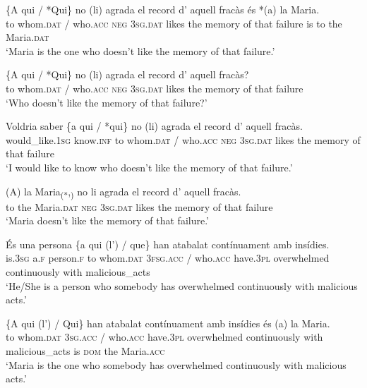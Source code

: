 \documentclass[output=paper,colorlinks,citecolor=brown,modfonts,nonflat]{langsci/langscibook}
\begin{document}
 \ex \label{ex:royo:15b}
 \gll  \{A qui / *Qui\} no (li) agrada el record d’ aquell fracàs és *(a) la Maria.\\
  to whom.\textsc{dat} / who.\textsc{acc} \textsc{neg} \textsc{3sg.dat} likes the memory of that failure is to the Maria.\textsc{dat}\\
\glt ‘Maria is the one who doesn’t like the memory of that failure.’



 \ex \label{ex:royo:15c}
 \gll \{A qui / *Qui\} no (li) agrada el record d’ aquell fracàs?\\
 to whom.\textsc{dat} / who.\textsc{acc} \textsc{neg} \textsc{3sg.dat} likes the memory of that failure\\
\glt ‘Who doesn’t like the memory of that failure?’

 \ex \label{ex:royo:15d}
 \gll Voldria saber \{a qui / *qui\} no (li) agrada el record d’ aquell fracàs.\\
 would\_like.\textsc{1sg} know.\textsc{inf} to whom.\textsc{dat} / who.\textsc{acc} \textsc{neg} \textsc{3sg.dat} likes the memory of that failure\\
\glt ‘I would like to know who doesn’t like the memory of that failure.’

 \ex \label{ex:royo:15e}
 \gll *(A) la Maria\textsubscript{(*},\textsubscript{)} no li agrada el record d’ aquell fracàs.\\
 to the Maria.\textsc{dat} \textsc{neg} \textsc{3sg.dat} likes the memory of that failure\\
\glt ‘Maria doesn’t like the memory of that failure.’

 \z
 \z


\ea%
 \label{ex:royo:16}
 \ea \label{ex:royo:16a}
 \gll És una persona \{a qui (l’) / que\} han atabalat contínuament amb insídies.\\
 is.\textsc{3sg} a.\textsc{f}  person.\textsc{f} to whom.\textsc{dat} \textsc{3fsg.acc} / who.\textsc{acc} have.\textsc{3pl} overwhelmed continuously with malicious\_acts\\
\glt ‘He/She is a person who somebody has overwhelmed continuously with malicious acts.’

 \ex \label{ex:royo:16b}
	\gll \{A qui (l’) / Qui\} han atabalat contínuament amb insídies és (a) la Maria.\\
	 to whom.\textsc{dat} \textsc{3sg.acc} / who.\textsc{acc} have.\textsc{3pl} overwhelmed continuously with malicious\_acts is \textsc{dom} the Maria.\textsc{acc}\\
	\glt ‘Maria is the one who somebody has overwhelmed continuously with malicious acts.’
\end{document}
